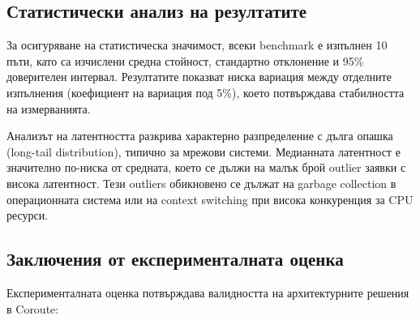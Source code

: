 \subsection{Статистически анализ на резултатите}

За осигуряване на статистическа значимост, всеки benchmark е изпълнен 10 пъти, като са изчислени средна стойност, стандартно отклонение и 95\% доверителен интервал. Резултатите показват ниска вариация между отделните изпълнения (коефициент на вариация под 5\%), което потвърждава стабилността на измерванията.

Анализът на латентността разкрива характерно разпределение с дълга опашка (long-tail distribution), типично за мрежови системи. Медианната латентност е значително по-ниска от средната, което се дължи на малък брой outlier заявки с висока латентност. Тези outliers обикновено се дължат на garbage collection в операционната система или на context switching при висока конкуренция за CPU ресурси.

\subsection{Заключения от експерименталната оценка}

Експерименталната оценка потвърждава валидността на архитектурните решения в Coroute:


